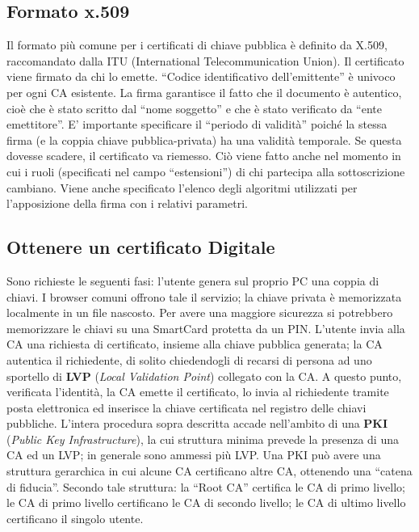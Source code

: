 \subsection{Formato x.509}

Il formato più comune per i certificati di chiave pubblica è definito da X.509, raccomandato dalla
ITU (International Telecommunication Union).
Il certificato viene firmato da chi lo emette. “Codice identificativo 
dell’emittente” è univoco per ogni
CA esistente. La firma garantisce il fatto che il documento è autentico,
cioè che è stato scritto dal
“nome soggetto” e che è stato verificato da “ente emettitore”.
E’ importante specificare il “periodo di validità” poiché la stessa firma
(e la coppia chiave
pubblica-privata) ha una validità temporale. Se questa dovesse scadere,
il certificato va riemesso.
Ciò viene fatto anche nel momento in cui i ruoli (specificati nel campo 
“estensioni”) di chi partecipa
alla sottoscrizione cambiano.
Viene anche specificato l’elenco degli algoritmi utilizzati per 
l’apposizione della firma con i relativi
parametri.


\subsection{Ottenere un certificato Digitale}

Sono richieste le seguenti fasi: l’utente genera sul proprio PC una coppia 
di chiavi. I browser
comuni offrono tale il servizio; la chiave privata è memorizzata localmente 
in un file nascosto. Per
avere una maggiore sicurezza si potrebbero memorizzare le chiavi su una 
SmartCard protetta da
un PIN. L’utente invia alla CA una richiesta di certificato, insieme alla
chiave pubblica generata; la
CA autentica il richiedente, di solito chiedendogli di recarsi di persona
ad uno sportello di \textbf{LVP}
(\textit{Local Validation Point}) collegato con la CA.
A questo punto, verificata l’identità, la CA emette il certificato, 
lo invia al richiedente tramite posta
elettronica ed inserisce la chiave certificata nel registro delle chiavi 
pubbliche.
L’intera procedura sopra descritta accade nell’ambito di una \textbf{PKI}
(\textit{Public Key Infrastructure}), la cui
struttura minima prevede la presenza di una CA ed un LVP; in generale 
sono ammessi più LVP.
Una PKI può avere una struttura gerarchica in cui alcune CA certificano
altre CA, ottenendo una
“catena di fiducia”. Secondo tale struttura: la “Root CA” certifica le
CA di primo livello; le CA di
primo livello certificano le CA di secondo livello; le CA di ultimo
livello certificano il singolo utente.

